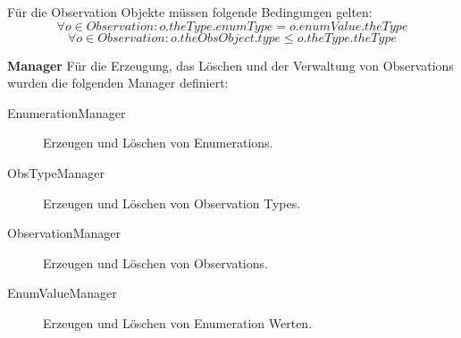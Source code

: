 Für die Observation Objekte müssen folgende Bedingungen gelten:
\begin{equation}\forall o \in Observation: o.theType.enumType = o.enumValue.theType
\end{equation}
\begin{equation}\forall o \in Observation: o.theObsObject.type \leq o.theType.theType
\end{equation}

\textbf{Manager} \newline
Für die Erzeugung, das Löschen und der Verwaltung von Observations wurden die folgenden Manager definiert:
\begin{description}
\item[EnumerationManager] Erzeugen und Löschen von Enumerations.
\item[ObsTypeManager] Erzeugen und Löschen von Observation Types.
\item[ObservationManager] Erzeugen und Löschen von Observations.
\item[EnumValueManager] Erzeugen und Löschen von Enumeration Werten.
\end{description}
